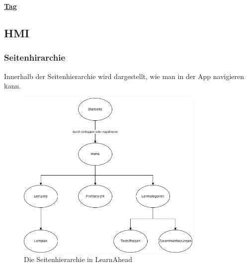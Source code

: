   \underline{\textbf{Tag}}
\begin{table}[H]
  \centering
  \end{table}
\subsection{HMI}

\subsubsection{Seitenhirarchie}
Innerhalb der Seitenhierarchie wird dargestellt, wie man in der App navigieren
kann.
\begin{figure}[H]
  \centering
  \includegraphics[width=0.8\textwidth]{images/diagramme/Seitenhierarchie.png}
  \caption{Die Seitenhierarchie in LearnAhead}
  \label{fig:UseCaseDiagramm1}
\end{figure}

